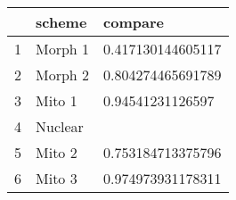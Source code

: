 \begin{table}[ht]
\centering
\begin{tabular}{rll}
  \hline
 & scheme & compare \\ 
  \hline
1 & Morph 1 & 0.417130144605117 \\ 
  2 & Morph 2 & 0.804274465691789 \\ 
  3 & Mito 1 & 0.94541231126597 \\ 
  4 & Nuclear &  \\ 
  5 & Mito 2 & 0.753184713375796 \\ 
  6 & Mito 3 & 0.974973931178311 \\ 
   \hline
\end{tabular}
\label{mmdif}
\end{table}
